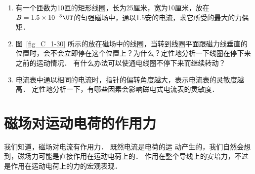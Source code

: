 \begin{enumerate}
\begin{figure}[htbp]
\begin{subfigure}{0.3\linewidth}
    		\caption{}\label{fig_C_1-33c}
    	\end{subfigure}
    	\caption{}\label{fig_C_1-33}
    \end{figure}
    \item 有一个匝数为10匝的矩形线圈，长为25厘米，宽为10厘米，放在$B=1.5\times10^{-3}\UT $的匀强磁场中，通以1.5安的电流，求它所受的最大的力偶矩．
    \item 图~\ref{fig_C_1-30} 所示的放在磁场中的线圈，当转到线圈平面跟磁力线垂直的位置时，会不会立即停在这个位置上？为什么？定性地分析一下线圈在停下来之前的运动情况．
    有什么办法可以使通电线圈不停下来而继续转动？
    \item 电流表中通以相同的电流时，指针的偏转角度越大，表示电流表的灵敏度越高．
    定性地分析一下，有哪些因素会影响磁电式电流表的灵敏度．
\end{enumerate}


\section{磁场对运动电荷的作用力}
我们知道，磁场对电流有作用力．
既然电流是电荷的运
动产生的，我们自然会想到，磁场力可能是直接作用在运动电荷上的．
作用在整个导线上的安培力，不过是作用在运动电荷上的力的宏观表现．


